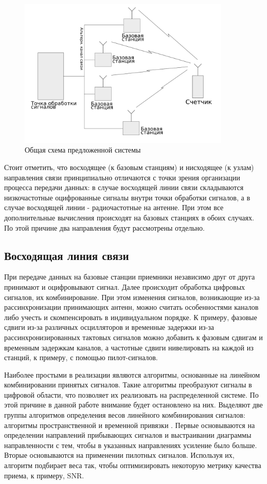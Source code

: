 \documentclass[a4paper,12pt,oneside, abstract=true]{scrartcl}
\begin{document}
\begin{figure}[!htb]
    \centering
    \includegraphics[width=0.9\textwidth]{pics/generalscheme.png}
    \caption{Общая схема предложенной системы}
    \label{fig:GenScheme}
\end{figure}

Стоит отметить, что восходящее (к базовым станциям) и нисходящее (к узлам) направления связи принципиально отличаются с точки зрения организации процесса передачи данных: в случае восходящей линии связи складываются низкочастотные оцифрованные сигналы внутри точки обработки сигналов, а в случае восходящей линии - радиочастотные на антенне. 
При этом все дополнительные вычисления происходят на базовых станциях в обоих случаях. По этой причине два направления будут рассмотрены отдельно.


\subsection{Восходящая линия связи}

При передаче данных на базовые станции приемники независимо друг от друга принимают и оцифровывают сигнал. 
Далее происходит обработка цифровых сигналов, их комбинирование. 
При этом изменения сигналов, возникающие из-за рассинхронизации принимающих антенн, можно считать особенностями каналов либо учесть и скомпенсировать в индивидуальном порядке. 
К примеру, фазовые сдвиги из-за различных осцилляторов и временные задержки из-за рассинхронизированных тактовых сигналов можно добавить к фазовым сдвигам и временным задержкам каналов, а частотные сдвиги нивелировать на каждой из станций, к примеру, с помощью пилот-сигналов\cite{A3}. 

Наиболее простыми в реализации являются алгоритмы, основанные на линейном комбинировании принятых сигналов. 
Такие алгоритмы преобразуют сигналы в цифровой области, что позволяет их реализовать на распределенной системе. 
По этой причине в данной работе внимание будет остановлено на них.
Выделяют две группы алгоритмов определения весов линейного комбинирования сигналов: алгоритмы пространственной и временной привязки \cite{B1}. 
Первые основываются на определении направлений прибывающих сигналов и выстраивании диаграммы направленности с тем, чтобы в указанных направлениях усиление было больше. 
Вторые основываются на применении пилотных сигналов. 
Используя их, алгоритм подбирает веса так, чтобы оптимизировать некоторую метрику качества приема, к примеру, SNR.
\end{document}
